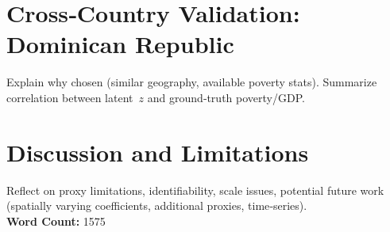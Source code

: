 \documentclass[12pt]{article}
\begin{document}
  
  
  
  
  
  
  
  


\section{Cross‑Country Validation: Dominican Republic}
\label{sec:validation}

Explain why chosen (similar geography, available poverty stats). Summarize correlation between latent~$z$ and ground‑truth poverty/GDP.

\section{Discussion and Limitations}
\label{sec:discussion}

Reflect on proxy limitations, identifiability, scale issues, potential future work (spatially varying coefficients, additional proxies, time‑series). \\


\noindent \textbf{Word Count:} 1575

\newpage


\printbibliography
\end{document}
